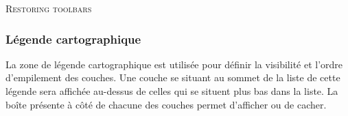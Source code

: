 %

\begin{Tip}
\caption{\textsc{Restoring toolbars}} 
\end{Tip}

\subsubsection{L\'egende cartographique}\label{label_legend}

%
%

La zone de l\'egende cartographique est utilis\'ee pour d\'efinir la visibilit\'e et l'ordre d'empilement des couches. Une couche se situant au sommet de la liste de cette l\'egende sera affich\'ee au-dessus de celles qui se situent plus bas dans la liste. La bo\^ite pr\'esente \`a c\^ot\'e de chacune des couches permet d'afficher ou de cacher.


